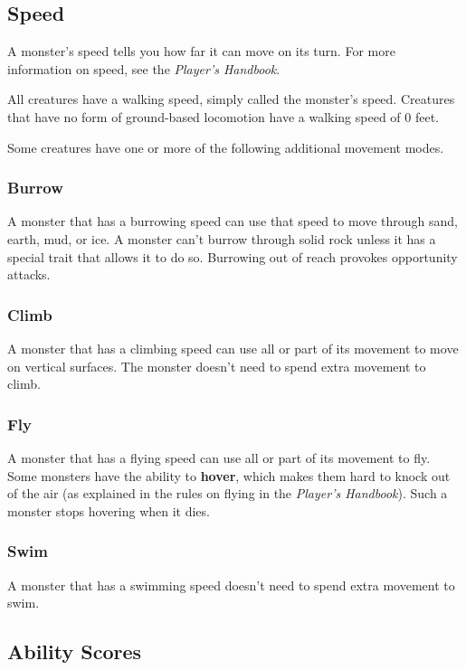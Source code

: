 \subsection{Speed}

A monster's speed tells you how far it can move on its turn. For more information on speed, see the \textit{Player's Handbook}.

All creatures have a walking speed, simply called the monster's speed. Creatures that have no form of ground-based locomotion have a walking speed of 0 feet.

Some creatures have one or more of the following additional movement modes.

\subsubsection{Burrow}

A monster that has a burrowing speed can use that speed to move through sand, earth, mud, or ice. A monster can't burrow through solid rock unless it has a special trait that allows it to do so. Burrowing out of reach provokes opportunity attacks.

\subsubsection{Climb}

A monster that has a climbing speed can use all or part of its movement to move on vertical surfaces. The monster doesn't need to spend extra movement to climb.

\subsubsection{Fly}

A monster that has a flying speed can use all or part of its movement to fly. Some monsters have the ability to \textbf{hover}, which makes them hard to knock out of the air (as explained in the rules on flying in the \textit{Player's Handbook}). Such a monster stops hovering when it dies.

\subsubsection{Swim}

A monster that has a swimming speed doesn't need to spend extra movement to swim.

\subsection{Ability Scores}

